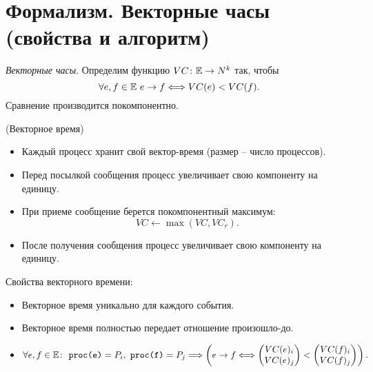 \section{Формализм. Векторные часы (свойства и алгоритм)}

\begin{definition}
    \textit{Векторные часы}. Определим функцию $VC \colon \mathbb{E} \to N^k$
    так, чтобы
    \[
        \forall e, f \in \mathbb{E}~ e \to f \Longleftrightarrow VC(e) < VC(f)
    .\]
    Сравнение производится покомпонентно.
\end{definition}

\begin{algorithm}(Векторное время)
    \begin{itemize}
        \item Каждый процесс хранит свой вектор-время (размер -- число процессов).
        \item Перед посылкой сообщения процесс увеличивает свою компоненту на единицу.
        \item При приеме сообщение берется покомпонентный максимум:
            \[
                VC \leftarrow \max(VC, VC_r)
            .\]
        \item После получения сообщения процесс увеличивает свою компоненту на единицу.
    \end{itemize}
\end{algorithm} 

Свойства векторного времени:
\begin{itemize}
    \item Векторное время уникально для каждого события.
    \item Векторное время полностью передает отношение произошло-до.
    \item 
        \[
            \forall e, f \in \mathbb{E}\colon~ \texttt{proc(e)} = P_i,~
            \texttt{proc(f)} = P_j \Longrightarrow
            \left(e \to f \Longleftrightarrow \begin{pmatrix}
                VC(e)_i \\
                VC(e)_j
            \end{pmatrix} < \begin{pmatrix}
                VC(f)_i \\ 
                VC(f)_j
            \end{pmatrix}\right)
        .\]
\end{itemize}
